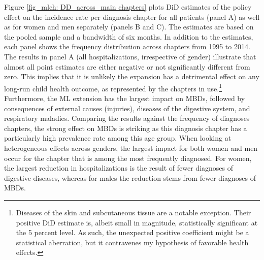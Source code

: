 \afterpage{


}



Figure \ref{fig_mlch: DD_across_main chapters} plots DiD estimates of the policy effect on the incidence rate per diagnosis chapter for all patients (panel A) as well as for women and men separately (panels B and C). The estimates are based on the pooled sample and a bandwidth of six months. In addition to the estimates, each panel shows the frequency distribution across chapters from 1995 to 2014. The results in panel A (all hospitalizations, irrespective of gender) illustrate that almost all point estimates are either negative or not significantly different from zero. This implies that it is unlikely the expansion has a detrimental effect on any long-run child health outcome, as represented by the chapters in use.\footnote{Diseases of the skin and subcutaneous tissue are a notable exception. Their positive DiD estimate is, albeit small in magnitude, statistically significant at the 5 percent level. As such, the unexpected positive coefficient might be a statistical aberration, but it contravenes my hypothesis of favorable health effects.} Furthermore, the ML extension has the largest impact on MBDs, followed by consequences of external causes (injuries), diseases of the digestive system, and respiratory maladies. Comparing the results against the frequency of diagnoses chapters, the strong effect on MBDs is striking as this diagnosis chapter has a particularly high prevalence rate among this age group. When looking at heterogeneous effects across genders, the largest impact for both women and men occur for the chapter that is among the most frequently diagnosed. For women, the largest reduction in hospitalizations is the result of fewer diagnoses of digestive diseases, whereas for males the reduction stems from fewer diagnoses of MBDs. 





